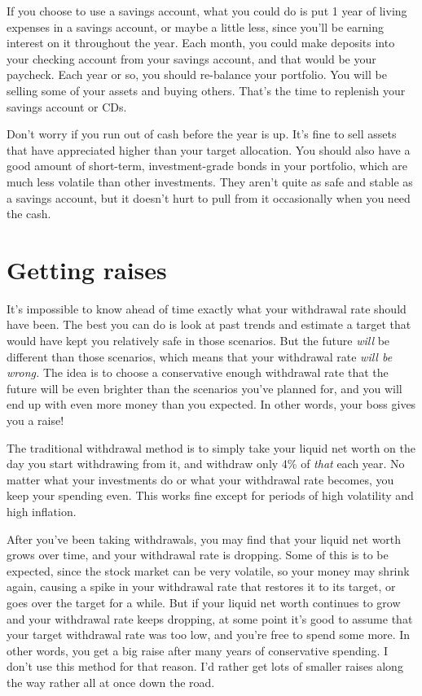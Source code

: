 If you choose to use a savings account, what you could do is put 1 year of living expenses in a savings account, or maybe a little less, since you'll be earning interest on it throughout the year. Each month, you could make deposits into your checking account from your savings account, and that would be your paycheck. Each year or so, you should re-balance your portfolio. You will be selling some of your assets and buying others. That's the time to replenish your savings account or CDs.

Don't worry if you run out of cash before the year is up. It's fine to sell assets that have appreciated higher than your target allocation. You should also have a good amount of short-term, investment-grade bonds in your portfolio, which are much less volatile than other investments. They aren't quite as safe and stable as a savings account, but it doesn't hurt to pull from it occasionally when you need the cash.

\section{Getting raises}
It's impossible to know ahead of time exactly what your withdrawal rate should have been. The best you can do is look at past trends and estimate a target that would have kept you relatively safe in those scenarios. But the future \emph{will} be different than those scenarios, which means that your withdrawal rate \emph{will be wrong.} The idea is to choose a conservative enough withdrawal rate that the future will be even brighter than the scenarios you've planned for, and you will end up with even more money than you expected. In other words, your boss gives you a raise!

The traditional withdrawal method is to simply take your liquid net worth on the day you start withdrawing from it, and withdraw only 4\% of \emph{that} each year. No matter what your investments do or what your withdrawal rate becomes, you keep your spending even. This works fine except for periods of high volatility and high inflation.

After you've been taking withdrawals, you may find that your liquid net worth grows over time, and your withdrawal rate is dropping. Some of this is to be expected, since the stock market can be very volatile, so your money may shrink again, causing a spike in your withdrawal rate that restores it to its target, or goes over the target for a while. But if your liquid net worth continues to grow and your withdrawal rate keeps dropping, at some point it's good to assume that your target withdrawal rate was too low, and you're free to spend some more. In other words, you get a big raise after many years of conservative spending. I don't use this method for that reason. I'd rather get lots of smaller raises along the way rather all at once down the road.

